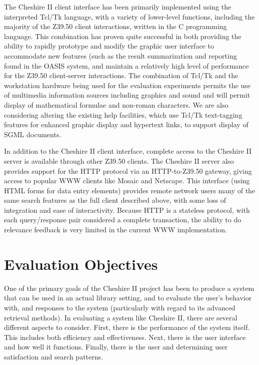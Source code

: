 The Cheshire II client interface has been primarily implemented using
the interpreted Tcl/Tk language\cite{TCL}, with a variety of
lower-level functions, including the majority of the Z39.50 client
interactions, written in the C programming language.  This combination
has proven quite successful in both providing the ability to rapidly
prototype and modify the graphic user interface to accommodate new
features (such as the result summarization and reporting found in the
OASIS system\cite{BUCKLAND}, and maintain a relatively high level of
performance for the Z39.50 client-server interactions.  The
combination of Tcl/Tk and the workstation hardware being used for the
evaluation experiments permits the use of multimedia information
sources including graphics and sound and will permit display of
mathematical formulae and non-roman characters.  We are also
considering altering the existing help facilities, which use Tcl/Tk
text-tagging features for enhanced graphic display and hypertext
links, to support display of SGML documents.

In addition to the Cheshire II client interface, complete access to
the Cheshire II server is available through other Z39.50 clients. The
Cheshire II server also provides support for the HTTP protocol via an
HTTP-to-Z39.50 gateway, giving access to popular WWW clients like
Mosaic and Netscape. This interface (using HTML forms for data entry
elements) provides remote network users many of the same search
features as the full client described above, with some loss of
integration and ease of interactivity. Because HTTP is a stateless
protocol, with each query/response pair considered a complete
transaction, the ability to do relevance feedback is very limited in
the current WWW implementation.


\section{Evaluation Objectives}

One of the primary goals of the Cheshire II project has been to
produce a system that can be used in an actual library setting, and to
evaluate the user's behavior with, and responses to the system
(particularly with regard to its advanced retrieval methods).  In
evaluating a system like Cheshire II, there are several different
aspects to consider.  First, there is the performance of the system
itself.  This includes both efficiency and effectiveness.  Next, there
is the user interface and how well it functions.  Finally, there is
the user and determining user satisfaction and search patterns.

